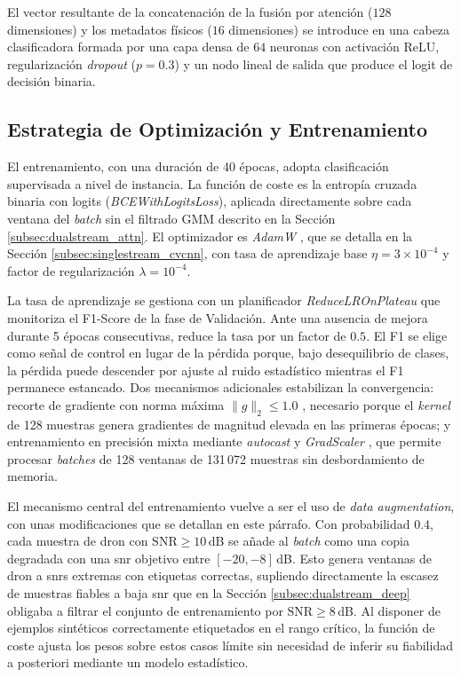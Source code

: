 El vector resultante de la concatenación de la fusión por atención ($128$ dimensiones) y los metadatos físicos ($16$ dimensiones) se introduce en una cabeza clasificadora formada por una capa densa de $64$ neuronas con activación ReLU, regularización \textit{dropout} ($p=0.3$) y un nodo lineal de salida que produce el logit de decisión binaria.

\subsection{Estrategia de Optimización y Entrenamiento}
El entrenamiento, con una duración de 40 épocas, adopta clasificación supervisada a nivel de instancia. La función de coste es la entropía cruzada binaria con logits (\textit{BCEWithLogitsLoss}), aplicada directamente sobre cada ventana del \textit{batch} sin el filtrado GMM descrito en la Sección \ref{subsec:dualstream_attn}. El optimizador es \textit{AdamW} \cite{loshchilov_decoupled_2019}, que se detalla en la Sección \ref{subsec:singlestream_cvcnn}, con tasa de aprendizaje base $\eta = 3\times10^{-4}$ y factor de regularización $\lambda = 10^{-4}$.

La tasa de aprendizaje se gestiona con un planificador \textit{ReduceLROnPlateau} que monitoriza el F1-Score de la fase de Validación. Ante una ausencia de mejora durante 5 épocas consecutivas, reduce la tasa por un factor de $0.5$. El F1 se elige como señal de control en lugar de la pérdida porque, bajo desequilibrio de clases, la pérdida puede descender por ajuste al ruido estadístico mientras el F1 permanece estancado. Dos mecanismos adicionales estabilizan la convergencia: recorte de gradiente con norma máxima $\|g\|_2 \leq 1.0$ \cite{pascanu_difficulty_2013}, necesario porque el \textit{kernel} de 128 muestras genera gradientes de magnitud elevada en las primeras épocas; y entrenamiento en precisión mixta mediante \textit{autocast} y \textit{GradScaler} \cite{micikevicius_mixed_2018}, que permite procesar \textit{batches} de 128 ventanas de 131\,072 muestras sin desbordamiento de memoria.

El mecanismo central del entrenamiento vuelve a ser el uso de \textit{data augmentation}, con unas modificaciones que se detallan en este párrafo. Con probabilidad $0.4$, cada muestra de dron con $\text{SNR} \geq 10$\,dB se añade al \textit{batch} como una copia degradada con una \gls{snr} objetivo entre $[-20, -8]$\,dB. Esto genera ventanas de dron a \gls{snr}s extremas con etiquetas correctas, supliendo directamente la escasez de muestras fiables a baja \gls{snr} que en la Sección \ref{subsec:dualstream_deep} obligaba a filtrar el conjunto de entrenamiento por $\text{SNR} \geq 8$\,dB. Al disponer de ejemplos sintéticos correctamente etiquetados en el rango crítico, la función de coste ajusta los pesos sobre estos casos límite sin necesidad de inferir su fiabilidad a posteriori mediante un modelo estadístico.

